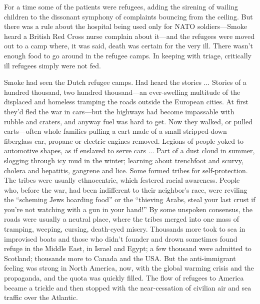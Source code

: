 For a time some of the patients were refugees, adding the sirening of wailing children to the dissonant symphony of complaints bouncing from the ceiling. But there was a rule about the hospital being used only for NATO soldiers---Smoke heard a British Red Cross nurse complain about it---and the refugees were moved out to a camp where, it was said, death was certain for the very ill. There wasn't enough food to go around in the refugee camps. In keeping with triage, critically ill refugees simply were not fed.

Smoke had seen the Dutch refugee camps. Had heard the stories ... Stories of a hundred thousand, two hundred thousand---an ever-swelling multitude of the displaced and homeless tramping the roads outside the European cities. At first they'd fled the war in cars---but the highways had become impassable with rubble and craters, and anyway fuel was hard to get. Now they walked, or pulled carts---often whole families pulling a cart made of a small stripped-down fiberglass car, propane or electric engines removed. Legions of people yoked to automotive shapes, as if enslaved to serve cars ... Part of a dust cloud in summer, slogging through icy mud in the winter; learning about trenchfoot and scurvy, cholera and hepatitis, gangrene and lice. Some formed tribes for self-protection. The tribes were usually ethnocentric, which festered racial awareness. People who, before the war, had been indifferent to their neighbor's race, were reviling the ``scheming Jews hoarding food'' or the ``thieving Arabs, steal your last crust if you're not watching with a gun in your hand!'' By some unspoken consensus, the roads were usually a neutral place, where the tribes merged into one mass of tramping, weeping, cursing, death-eyed misery. Thousands more took to sea in improvised boats and those who didn't founder and drown sometimes found refuge in the Middle East, in Israel and Egypt; a few thousand were admitted to Scotland; thousands more to Canada and the USA. But the anti-immigrant feeling was strong in North America, now, with the global warming crisis and the propaganda, and the quota was quickly filled. The flow of refugees to America became a trickle and then stopped with the near-cessation of civilian air and sea traffic over the Atlantic.

